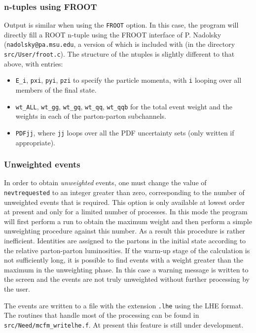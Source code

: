 \documentclass[12pt]{article}
\begin{document}
\subsubsection{n-tuples using FROOT}
Output is similar when using the {\tt FROOT} option. In this case, the program will directly
fill a ROOT n-tuple using the FROOT interface of P. Nadolsky ({\tt nadolsky@pa.msu.edu}, a version
of which is included with \MCFM (in the directory {\tt src/User/froot.c}). The structure
of the ntuples is slightly different to that above, with entries:
\begin{itemize}
\item {\tt E\_i}, {\tt pxi}, {\tt pyi}, {\tt pzi} to specify the particle momenta, with {\tt i}
 looping over all members of the final state.
\item {\tt wt\_ALL}, {\tt wt\_gg}, {\tt wt\_gq}, {\tt wt\_qq}, {\tt wt\_qqb} for the total event
 weight and the weights in each of the parton-parton subchannels.
\item {\tt PDFjj}, where {\tt jj} loops over all the PDF uncertainty sets (only written if
 appropriate).
\end{itemize}

\subsubsection{Unweighted events}

In order to obtain {\it unweighted} events, one must change the value of
{\tt nevtrequested} to an integer greater than zero, corresponding to the
number of unweighted events that is required. This option is only available at lowest order
at present and only for a limited number of processes.
In this mode the program will first perform a run to obtain the
maximum weight and then perform a simple unweighting procedure against this
number.   As a result this procedure is rather inefficient.
Identities are assigned to the
partons in the initial state according to the relative parton-parton
luminosities.  If the warm-up stage of the calculation is not sufficiently long, it 
is possible to find events with a weight greater than the maximum in the unweighting
phase.  In this case a warning message is written to the screen and the events are
not truly unweighted without further processing by the user.

The events are written to a file with the extension {\tt .lhe} using the LHE format.
The routines that handle most of the processing can be found in {\tt src/Need/mcfm\_writelhe.f}.
At present this feature is still under development. 
\end{document}
